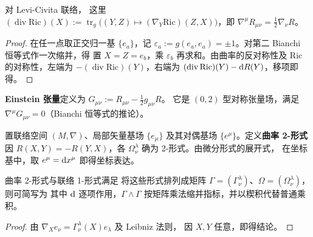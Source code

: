 \begin{corollary}
    对 Levi-Civita 联络，
    这里 $(\operatorname{div}\mathrm{Ric})(X):=\operatorname{tr}_g\bigl((Y,Z)\mapsto(\nabla_Y\mathrm{Ric})(Z,X)\bigr)$，即 $\nabla^\mu R_{\mu\nu}=\frac12\nabla_\nu R$。
\end{corollary}
\begin{proof}
    在任一点取正交归一基 $\{e_a\}$，记 $\varepsilon_a:=g(e_a,e_a)=\pm1$。对第二 Bianchi 恒等式作一次缩并，得
    置 $X=Z=e_b$，乘 $\varepsilon_b$ 再求和。由曲率的反对称性及 $\mathrm{Ric}$ 的对称性，左端为 $-(\operatorname{div}\mathrm{Ric})(Y)$，右端为 $(\operatorname{div}\mathrm{Ric})(Y)-\dd R(Y)$，移项即得。
\end{proof}

\begin{example}
    \textbf{Einstein 张量}定义为 $G_{\mu\nu}:=R_{\mu\nu}-\frac{1}{2}g_{\mu\nu}R$。
    它是 $(0,2)$ 型对称张量场，满足 $\nabla^\mu G_{\mu\nu}=0$（Bianchi 恒等式的推论）。
\end{example}

\begin{definition}
    置联络空间 $(M,\nabla)$、局部矢量基场 $\{e_\mu\}$ 及其对偶基场 $\{e^\mu\}$。定义\textbf{曲率 2-形式}
    因 $R(X,Y)=-R(Y,X)$，各 $\Omega^\lambda_\nu$ 确为 2-形式。由微分形式的展开式，
    在坐标基中，取 $e^\mu=\dd x^\mu$ 即得坐标表达。
\end{definition}

\begin{theorem}
    曲率 2-形式与联络 1-形式满足
    将这些形式排列成矩阵 $\Gamma=(\Gamma^\lambda_\nu)$、$\Omega=(\Omega^\lambda_\nu)$，则可简写为
    \eq{\Omega=\d\Gamma+\Gamma\wedge\Gamma,}
    其中 $\dd$ 逐项作用，$\Gamma\wedge\Gamma$ 按矩阵乘法缩并指标，并以楔积代替普通乘积。
\end{theorem}
\begin{proof}
    由 $\nabla_Xe_\nu=\Gamma^\lambda_\nu(X)e_\lambda$ 及 Leibniz 法则，
    因 $X,Y$ 任意，即得结论。
\end{proof}

